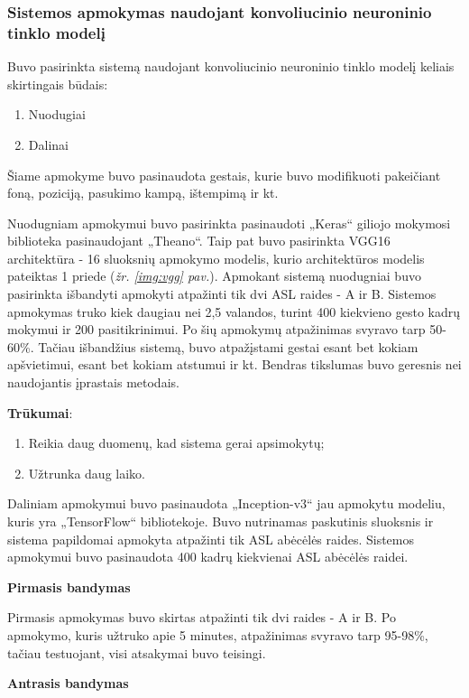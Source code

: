 \documentclass{VUMIFInfKursinis}
\begin{document}
\subsubsection{Sistemos apmokymas naudojant konvoliucinio neuroninio tinklo modelį}

Buvo pasirinkta sistemą naudojant konvoliucinio neuroninio tinklo modelį keliais skirtingais būdais:
\begin{enumerate}
	\item Nuodugiai
	\item Dalinai
\end{enumerate}
Šiame apmokyme buvo pasinaudota gestais, kurie buvo modifikuoti pakeičiant foną, poziciją, pasukimo kampą, ištempimą ir kt.


Nuodugniam apmokymui buvo pasirinkta pasinaudoti „Keras“ giliojo mokymosi biblioteka pasinaudojant „Theano“. Taip pat buvo pasirinkta VGG16 architektūra - 16 sluoksnių apmokymo modelis, kurio architektūros modelis pateiktas 1 priede (\textit{žr. \ref{img:vgg} pav.}). Apmokant sistemą nuodugniai buvo pasirinkta išbandyti apmokyti atpažinti tik dvi ASL raides - A ir B. Sistemos apmokymas truko kiek daugiau nei 2,5 valandos, turint 400 kiekvieno gesto kadrų mokymui ir 200 pasitikrinimui. Po šių apmokymų atpažinimas svyravo tarp 50-60\%. Tačiau išbandžius sistemą, buvo atpažįstami gestai esant bet kokiam apšvietimui, esant bet kokiam atstumui ir kt. Bendras tikslumas buvo geresnis nei naudojantis įprastais metodais.

\textbf{Trūkumai}:
\begin{enumerate}
	\item Reikia daug duomenų, kad sistema gerai apsimokytų;
	\item Užtrunka daug laiko.
\end{enumerate}

Daliniam apmokymui buvo pasinaudota „Inception-v3“ jau apmokytu modeliu, kuris yra „TensorFlow“ bibliotekoje. Buvo nutrinamas paskutinis sluoksnis ir sistema papildomai apmokyta atpažinti tik ASL abėcėlės raides. Sistemos apmokymui buvo pasinaudota 400 kadrų kiekvienai ASL abėcėlės raidei. 

\textbf{Pirmasis bandymas}

Pirmasis apmokymas buvo skirtas atpažinti tik dvi raides - A ir B. Po apmokymo, kuris užtruko apie 5 minutes, atpažinimas svyravo tarp 95-98\%, tačiau testuojant, visi atsakymai buvo teisingi.

\textbf{Antrasis bandymas}
\end{document}

